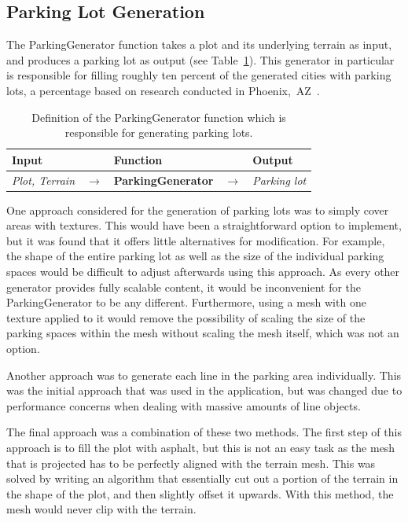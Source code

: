 \subsection{Parking Lot Generation}
The ParkingGenerator function takes a plot and its underlying terrain as input, and produces a parking lot as output (see Table~\ref{table:parking}).
This generator in particular is responsible for filling roughly ten percent of the generated cities with parking lots, a percentage based on research conducted in Phoenix,~AZ~\cite{parking_percent}.

\begin{table}[H]
   \centering
   \begin{tabular}{lllll}
     \textbf{Input}                           &               & \textbf{Function}            &               & \textbf{Output}         \\
     \midrule
     \textit{Plot, Terrain}                   & $\rightarrow$ & \textbf{ParkingGenerator}       & $\rightarrow$ & \textit{Parking lot}           \\
     \bottomrule
   \end{tabular}

   \caption{Definition of the ParkingGenerator function which is responsible for generating parking lots.}
   \label{table:parking}
 \end{table}
 \vspace{-0.4cm}

One approach considered for the generation of parking lots was to simply cover areas with textures.
This would have been a straightforward option to implement, but it was found that it offers little alternatives for modification.
For example, the shape of the entire parking lot as well as the size of the individual parking spaces would be difficult to adjust afterwards using this approach.
As every other generator provides fully scalable content, it would be inconvenient for the ParkingGenerator to be any different.
Furthermore, using a mesh with one texture applied to it would remove the possibility of scaling the size of the parking spaces within the mesh without scaling the mesh itself, which was not an option.

Another approach was to generate each line in the parking area individually. 
This was the initial approach that was used in the application, but was changed due to performance concerns when dealing with massive amounts of line objects.

The final approach was a combination of these two methods.
The first step of this approach is to fill the plot with asphalt, but this is not an easy task as the mesh that is projected has to be perfectly aligned with the terrain mesh.
This was solved by writing an algorithm that essentially cut out a portion of the terrain in the shape of the plot, and then slightly offset it upwards.
With this method, the mesh would never clip with the terrain. 

